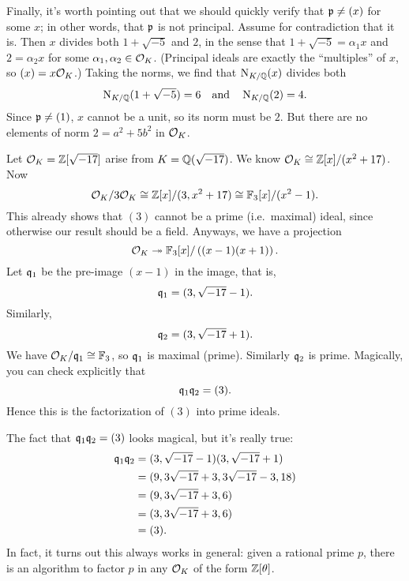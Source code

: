Finally, it's worth pointing out that we should quickly verify that $\mathfrak p \neq (x)$ for some $x$;
in other words, that $\mathfrak p$ is not principal.
Assume for contradiction that it is.
Then $x$ divides both $1+\sqrt{-5}$ and $2$, in the sense
that $1+\sqrt{-5} = \alpha_1 x$ and $2 = \alpha_2 x$
for some $\alpha_1, \alpha_2 \in \mathcal O_K$.
(Principal ideals are exactly the ``multiples'' of $x$, so $(x) = x \mathcal O_K$.)
Taking the norms, we find that $\operatorname{N}_{K/\mathbb Q}(x)$ divides both 
\[ \operatorname{N}_{K/\mathbb Q}(1+\sqrt{-5}) = 6 \quad\text{and}\quad \operatorname{N}_{K/\mathbb Q}(2) = 4. \]
Since $\mathfrak p \neq (1)$, $x$ cannot be a unit, so its norm must be $2$.
But there are no elements of norm $2 = a^2+5b^2$ in $\mathcal O_K$.

\begin{example}
	Let $\mathcal O_K = \mathbb Z[\sqrt{-17}]$ arise from $K = \mathbb Q(\sqrt{-17})$.
	We know $\mathcal O_K \cong \mathbb Z[x] / (x^2+17)$.
	Now 
	\[
		\mathcal O_K / 3\mathcal O_K \cong \mathbb Z[x] / (3,x^2+17)
		\cong \mathbb F_3[x] / (x^2-1).
	\]
	This already shows that $(3)$ cannot be a prime (i.e.\ maximal) ideal,
	since otherwise our result should be a field.
	Anyways, we have a projection \[ \mathcal O_K \twoheadrightarrow \mathbb F_3[x] / \left( (x-1)(x+1) \right). \]
	Let $\mathfrak q_1$ be the pre-image $(x-1)$ in the image, that is,
	\[ \mathfrak q_1 = (3, \sqrt{-17}-1). \]
	Similarly, \[ \mathfrak q_2 = (3, \sqrt{-17}+1). \]
	We have $\mathcal O_K / \mathfrak q_1 \cong \mathbb F_3$, so $\mathfrak q_1$ is maximal (prime).
	Similarly $\mathfrak q_2$ is prime.
	Magically, you can check explicitly that
	\[ \mathfrak q_1 \mathfrak q_2 = (3). \]
	Hence this is the factorization of $(3)$ into prime ideals.
\end{example}

The fact that $\mathfrak q_1 \mathfrak q_2 = (3)$ looks magical, but it's really true:
\begin{align*}
	\mathfrak q_1\mathfrak q_2
	&= (3, \sqrt{-17}-1) (3, \sqrt{-17}+1) \\
	&= (9, 3\sqrt{-17}+3, 3\sqrt{-17}-3, 18) \\
	&= (9, 3\sqrt{-17}+3, 6) \\
	&= (3, 3\sqrt{-17}+3, 6) \\
	&= (3).
\end{align*}
In fact, it turns out this always works in general:
given a rational prime $p$, there is an algorithm
to factor $p$ in any $\mathcal O_K$ of the form $\mathbb Z[\theta]$.

